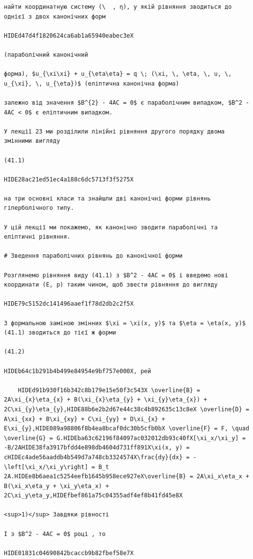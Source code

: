 \documentclass[
  ukrainian,
]{article}
\begin{document}
\begin{verbatim}
найти координатную систему (\  , η), у якій рівняння зводиться до однієї з двох канонічних форм

HIDEd47d4f1820624ca6ab1a65940eabec3eX

(параболічний канонічний

форма), $u_{\xi\xi} + u_{\eta\eta} = q \; (\xi, \, \eta, \, u, \, u_{\xi}, \, u_{\eta})$ (еліптична канонічна форма)

залежно від значення $B^{2} - 4AC = 0$ є параболічним випадком, $B^2 - 4AC < 0$ є еліптичним випадком.

У лекції 23 ми розділили лінійні рівняння другого порядку двома змінними вигляду

(41.1)

HIDE28ac21ed51ec4a188c6dc5713f3f5275X

на три основні класи та знайшли дві канонічні форми рівнянь гіперболічного типу.

У цій лекції ми покажемо, як канонічно зводити параболічні та еліптичні рівняння.

# Зведення параболічних рівнянь до канонічної форми

Розглянемо рівняння виду (41.1) з $B^2 - 4AC = 0$ і введемо нові координати (E, p) таким чином, щоб звести рівняння до вигляду

HIDE79c5152dc141496aaef1f78d2db2c2f5X

З формальною заміною змінних $\xi = \xi(x, y)$ та $\eta = \eta(x, y)$ (41.1) зводиться до тієї ж форми

(41.2)

HIDEb64c1b291b4b499e84954e9bf757e000X, рей

    HIDEd91b930f16b342c8b179e15e50f3c543X \overline{B} = 2A\xi_{x}\eta_{x} + B(\xi_{x}\eta_{y} + \xi_{y}\eta_{x}) + 2C\xi_{y}\eta_{y},HIDE88b6e2b2d67e44c38c4b892635c13c8eX \overline{D} = A\xi_{xx} + B\xi_{xy} + C\xi_{yy} + D\xi_{x} + E\xi_{y},HIDE089a98806f8b4ea8bcaf0dc30b5cfb0bX \overline{F} = F, \quad \overline{G} = G.HIDEba63c62196f84097ac032012db93c40fX[\xi_x/\xi_y] = -B/2AHIDE38fa3917bfdd4e898db4604d731ff891X\xi(x, y) = cHIDEc4ade56aaddb4b549d7a748cb3324574X\frac{dy}{dx} = -\left[\xi_x/\xi_y\right] = B_t 2A.HIDEe8b6aea1c5254eefb1645b958ece927eX\overline{B} = 2A\xi_x\eta_x + B(\xi_x\eta_y + \xi_y\eta_x) + 2C\xi_y\eta_y,HIDEfbef861a75c04355adf4ef8b41fd45e8X

<sup>1)</sup> Завдяки рівності

І з $B^2 - 4AC = 0$ році , то

HIDE01831c04690842bcaccb9b82fbef58e7X


\end{verbatim}
\end{document}
